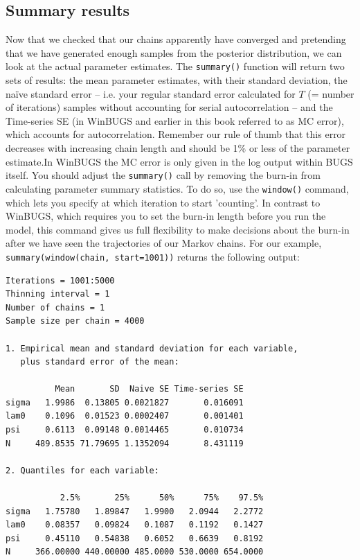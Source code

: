 \subsection{Summary results}
Now that we checked that our chains apparently have converged and pretending that we have generated enough samples from the posterior distribution, we can look at the actual parameter estimates. The \verb#summary()# function will return two sets of results: the mean parameter estimates, with their standard deviation, the naïve standard error -- i.e. your regular standard error calculated for $T$ (= number of iterations) samples without accounting for serial autocorrelation -- and the Time-series SE (in WinBUGS and earlier in this book referred to as MC error), which accounts for autocorrelation. Remember our rule of thumb that this error decreases with increasing chain length and should be 1\% or less of the parameter estimate.In WinBUGS the MC error is only given in the log output within BUGS itself.
You should adjust the \verb#summary()# call by removing the burn-in from
calculating parameter summary statistics. To do so, use the \verb#window()#
command, which lets you specify at which iteration to start
'counting'. In contrast to WinBUGS, which requires you to set the
burn-in length before you run the model, this command gives us full
flexibility to make decisions about the burn-in after we have seen the
trajectories of our Markov chains. For our example,
\verb#summary(window(chain, start=1001))# returns the following output:


\begin{verbatim}
Iterations = 1001:5000
Thinning interval = 1
Number of chains = 1
Sample size per chain = 4000

1. Empirical mean and standard deviation for each variable,
   plus standard error of the mean:

          Mean       SD  Naive SE Time-series SE
sigma   1.9986  0.13805 0.0021827       0.016091
lam0    0.1096  0.01523 0.0002407       0.001401
psi     0.6113  0.09148 0.0014465       0.010734
N     489.8535 71.79695 1.1352094       8.431119

2. Quantiles for each variable:

           2.5%       25%      50%      75%    97.5%
sigma   1.75780   1.89847   1.9900   2.0944   2.2772
lam0    0.08357   0.09824   0.1087   0.1192   0.1427
psi     0.45110   0.54838   0.6052   0.6639   0.8192
N     366.00000 440.00000 485.0000 530.0000 654.0000
\end{verbatim}

